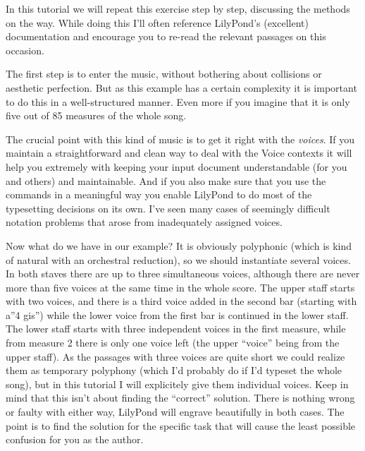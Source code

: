 \documentclass[../LilyPond-Tutorials]{subfiles}
\begin{document}
In this tutorial we will repeat this exercise step by step, discussing the methods on the way. 
While doing this I'll often reference LilyPond's (excellent) documentation and encourage you to re-read the relevant passages on this occasion.

The first step is to enter the music, without bothering about collisions or aesthetic perfection. 
But as this example has a certain complexity it is important to do this in a well-structured manner. 
Even more if you imagine that it is only five out of 85 measures of the whole song.

The crucial point with this kind of music is to get it right with the \emph{voices}. 
If you maintain a straightforward and clean way to deal with the Voice contexts  it will help you extremely with keeping your input document understandable (for you and others) and maintainable. 
And if you also make sure that you use the  commands  in a meaningful way you enable LilyPond to do most of the typesetting decisions on its own. I've seen many cases of seemingly difficult notation problems that arose from inadequately assigned voices.

Now what do we have in our example? 
It is obviously polyphonic (which is kind of natural with an orchestral reduction), so we should instantiate several voices. 
In both staves there are up to three simultaneous voices, although there are never more than five voices at the same time in the whole score. 
The upper staff starts with two voices, and there is a third voice added in the second bar (starting with a''4 gis'') while the lower voice from the first bar is continued in the lower staff. 
The lower staff starts with three independent voices in the first measure, while from measure 2 there is only one voice left (the upper “voice” being from the upper staff). 
As the passages with three voices are quite short we could realize them as temporary polyphony (which I'd probably do if I'd typeset the whole song), but in this tutorial I will explicitely give them individual voices. 
Keep in mind that this isn't about finding the “correct” solution. 
There is nothing wrong or faulty with either way, LilyPond will engrave beautifully in both cases. 
The point is to find the solution for the specific task that will cause the least possible confusion for you as the author.
\end{document}
